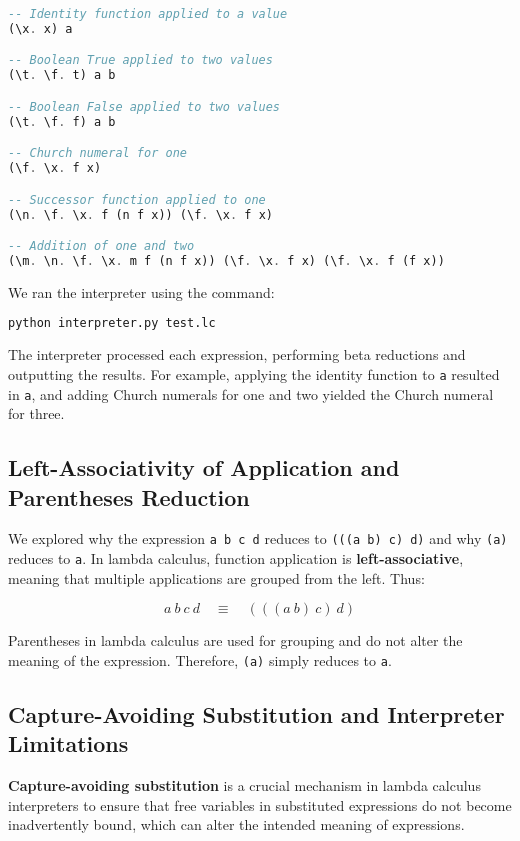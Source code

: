\documentclass{article}
\begin{document}
\begin{lstlisting}[language=Haskell]
-- Identity function applied to a value
(\x. x) a

-- Boolean True applied to two values
(\t. \f. t) a b

-- Boolean False applied to two values
(\t. \f. f) a b

-- Church numeral for one
(\f. \x. f x)

-- Successor function applied to one
(\n. \f. \x. f (n f x)) (\f. \x. f x)

-- Addition of one and two
(\m. \n. \f. \x. m f (n f x)) (\f. \x. f x) (\f. \x. f (f x))
\end{lstlisting}

We ran the interpreter using the command:

\begin{lstlisting}[language=bash]
python interpreter.py test.lc
\end{lstlisting}

The interpreter processed each expression, performing beta reductions and outputting the results. For example, applying the identity function to \texttt{a} resulted in \texttt{a}, and adding Church numerals for one and two yielded the Church numeral for three.

\subsection*{Left-Associativity of Application and Parentheses Reduction}

We explored why the expression \texttt{a b c d} reduces to \texttt{(((a b) c) d)} and why \texttt{(a)} reduces to \texttt{a}. In lambda calculus, function application is \textbf{left-associative}, meaning that multiple applications are grouped from the left. Thus:

\[
a\ b\ c\ d \quad \equiv \quad (((a\ b)\ c)\ d)
\]

Parentheses in lambda calculus are used for grouping and do not alter the meaning of the expression. Therefore, \texttt{(a)} simply reduces to \texttt{a}.

\subsection*{Capture-Avoiding Substitution and Interpreter Limitations}

\textbf{Capture-avoiding substitution} is a crucial mechanism in lambda calculus interpreters to ensure that free variables in substituted expressions do not become inadvertently bound, which can alter the intended meaning of expressions.
\end{document}
